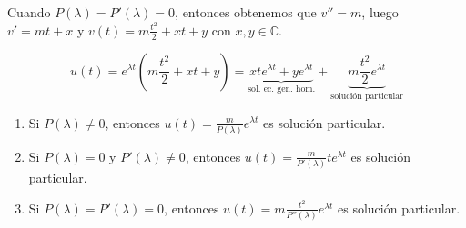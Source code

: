 {Cuando $P(\lambda) = P'(\lambda) = 0$, entonces obtenemos que $v'' = m$, luego $v' = mt + x$ y $v(t) = m\frac{t^2}{2} + xt + y$ con $x,y \in \mathbb{C}$. 

\[
    u(t) = e^{\lambda t} \left( m\frac{t^2}{2} + xt + y \right) = \underbrace{x t e^{\lambda t} + y e^{\lambda t}}_{\text{sol. ec. gen. hom.}} + \underbrace{m\frac{t^2}{2} e^{\lambda t}}_{\text{solución particular}}
\]

\begin{enumerate}
    \item Si $P(\lambda) \neq 0$, entonces $u(t) = \frac{m}{P(\lambda)} e^{\lambda t}$ es solución particular.
    \item Si $P(\lambda) = 0$ y $P'(\lambda) \neq 0$, entonces $u(t) = \frac{m}{P'(\lambda)} t e^{\lambda t}$ es solución particular.
    \item Si $P(\lambda) = P'(\lambda) = 0$, entonces $u(t) = m\frac{t^2}{P''(\lambda)} e^{\lambda t}$ es solución particular.
\end{enumerate}

}

